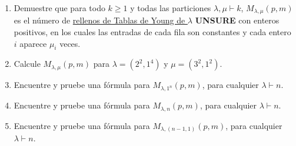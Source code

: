 \documentclass{article}
\begin{document}
\begin{enumerate}
\item Demuestre que para todo $k\geq 1$ y todas las particiones $\lambda, \mu\vdash k$, $M_{\lambda, \mu}(p,m)$ es el número de \underline{rellenos de Tablas de Young de $\lambda$} \textbf{UNSURE} con enteros positivos, en los cuales las entradas de cada fila son constantes y cada entero $i$ aparece $\mu_i$ veces.
\item Calcule $M_{\lambda,\mu}(p,m)$ para $\lambda=(2^2,1^4)$ y $\mu=(3^2,1^2)$.
\item Encuentre y pruebe una fórmula para $M_{\lambda, 1^n}(p,m)$, para cualquier $\lambda \vdash n$.
\item Encuentre y pruebe una fórmula para $M_{\lambda, n}(p,m)$, para cualquier $\lambda \vdash n$.
\item Encuentre y pruebe una fórmula para $M_{\lambda, (n-1,1)}(p,m)$, para cualquier $\lambda \vdash n$.
\end{enumerate}
\end{document}
